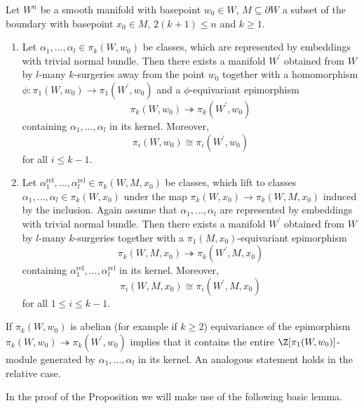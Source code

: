 \begin{proposition}
    \label{appendix:prop:surger_killer}
    Let $W^n$ be a smooth manifold with basepoint $w_0 \in W$, $M \subseteq \partial W$ a subset of the boundary with basepoint $x_0 \in M$, $2(k+1) \leq n$ and $k \geq 1$.
    \begin{enumerate}[label=(\roman*)]
        \item \label{appendix:eq:surgery_killer_absolute_version} Let $\alpha_1,\ldots,\alpha_l \in \pi_k(W,w_0)$ be classes, which are represented by embeddings with trivial normal bundle. Then there exists a manifold $W^\prime$ obtained from $W$ by $l$-many $k$-surgeries away from the point $w_0$ together with a homomorphism $\phi \colon \pi_1(W,w_0) \to \pi_1(W^\prime,w_0)$ and a $\phi$-equivariant epimorphism
        \[
        \pi_k(W,w_0) \twoheadrightarrow \pi_k(W^\prime,w_0)
        \]
        containing $\alpha_1,\ldots,\alpha_l$ in its kernel. Moreover, 
        \[
        \pi_i(W,w_0) \cong \pi_i(W^\prime,w_0)
        \] 
        for all $i \leq k-1$.
        \item \label{appendix:eq:surgery_killer_relative_version} Let $\alpha_1^\mathrm{rel},\ldots,\alpha_l^\mathrm{rel} \in \pi_k(W,M,x_0)$ be classes, which lift to classes $\alpha_1,\ldots,\alpha_l \in \pi_k(W,x_0)$ under the map $\pi_k(W,x_0) \to \pi_k(W,M,x_0)$ induced by the inclusion. Again assume that $\alpha_1,\ldots,\alpha_l$ are represented by embeddings with trivial normal bundle. Then there exists a manifold $W^\prime$ obtained from $W$ by $l$-many $k$-surgeries together with a $\pi_1(M,x_0)$-equivariant epimorphism
        \[
        \pi_k(W,M,x_0) \twoheadrightarrow \pi_k(W^\prime,M,x_0)
        \]
        containing $\alpha_1^\mathrm{rel},\ldots,\alpha_l^\mathrm{rel}$ in its kernel. Moreover, 
        \[
        \pi_i(W,M,x_0) \cong \pi_i(W^\prime,M,x_0)
        \] 
        for all $1 \leq i \leq k-1$.
    \end{enumerate}
\end{proposition}

\begin{remark}
    If $\pi_k(W,w_0)$ is abelian (for example if $k \geq 2$) equivariance of the epimorphism $\pi_k(W,w_0) \twoheadrightarrow \pi_k(W^\prime,w_0)$ implies that it contains the entire $\Z[\pi_1(W,w_0)]$-module generated by $\alpha_1,\ldots,\alpha_l$ in its kernel. An analogous statement holds in the relative case. 
\end{remark}

\noindent In the proof of the Proposition we will make use of the following basic lemma. 


